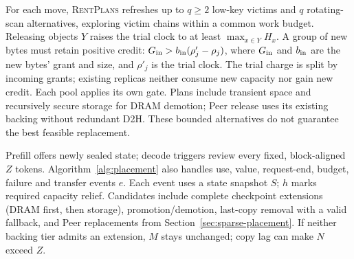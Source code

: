 For each move, \textsc{RentPlans} refreshes up to $q\ge2$ low-key victims
and $q$ rotating-scan alternatives, exploring victim chains within a common
work budget. Releasing objects $Y$ raises the trial clock to at least
$\max_{x\in Y}H_x$. A group of new bytes must retain positive credit:
$G_{\rm in}>b_{\rm in}(\rho'_j-\rho_j)$, where $G_{\rm in}$ and
$b_{\rm in}$ are the new bytes' grant and size, and $\rho'_j$ is the trial
clock. The trial charge is split by incoming grants; existing replicas neither consume new capacity nor gain
new credit. Each pool applies its own gate. Plans include transient space
and recursively secure storage for DRAM demotion; Peer release uses its
existing backing without redundant D2H. These bounded alternatives do
not guarantee the best feasible replacement.

Prefill offers newly sealed state; decode triggers review every fixed,
block-aligned $Z$ tokens. Algorithm~\ref{alg:placement} also handles use,
value, request-end, budget, failure and transfer events $e$.
Each event uses a state snapshot $S$; $h$ marks required capacity relief.
Candidates include complete checkpoint extensions (DRAM first, then
storage), promotion/demotion, last-copy removal with a valid fallback,
and Peer replacements from Section~\ref{sec:sparse-placement}.
If neither backing tier admits an extension, $M$ stays unchanged;
copy lag can make $N$ exceed $Z$.

